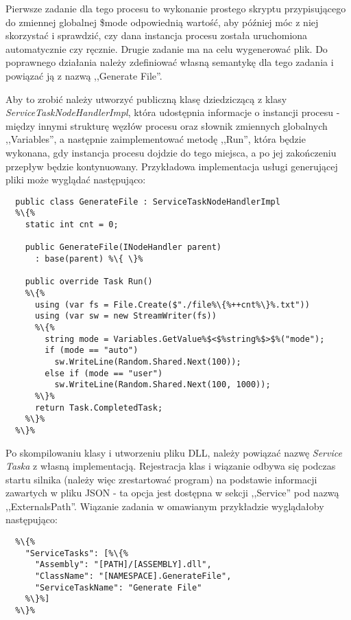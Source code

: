 \documentclass[declaration,shortabstract,mgr]{iithesis}
\begin{document}
Pierwsze zadanie dla tego procesu to wykonanie prostego skryptu przypisującego do zmiennej globalnej \$mode odpowiednią wartość, aby później móc z niej skorzystać i sprawdzić, czy dana instancja procesu została uruchomiona automatycznie czy ręcznie. Drugie zadanie ma na celu wygenerować plik. Do poprawnego działania należy zdefiniować własną semantykę dla tego zadania i powiązać ją z nazwą ,,Generate File''.

Aby to zrobić należy utworzyć publiczną klasę dziedziczącą z klasy \textit{ServiceTaskNodeHandlerImpl}, która udostępnia informacje o instancji procesu - między innymi strukturę węzłów procesu oraz słownik zmiennych globalnych ,,Variables'', a następnie zaimplementować metodę ,,Run'', która będzie wykonana, gdy instancja procesu dojdzie do tego miejsca, a po jej zakończeniu przepływ będzie kontynuowany. Przykładowa implementacja usługi generującej pliki może wyglądać następująco:

\begin{minipage}[c]{\textwidth}
\centering
\begin{lstlisting}
  public class GenerateFile : ServiceTaskNodeHandlerImpl
  %\{%
    static int cnt = 0;

    public GenerateFile(INodeHandler parent)
      : base(parent) %\{ \}%

    public override Task Run()
    %\{%
      using (var fs = File.Create($"./file%\{%++cnt%\}%.txt"))
      using (var sw = new StreamWriter(fs))
      %\{%
        string mode = Variables.GetValue%$<$%string%$>$%("mode");
        if (mode == "auto")
          sw.WriteLine(Random.Shared.Next(100));
        else if (mode == "user")
          sw.WriteLine(Random.Shared.Next(100, 1000));
      %\}%
      return Task.CompletedTask;
    %\}%
  %\}%
\end{lstlisting}
\end{minipage}

Po skompilowaniu klasy i utworzeniu pliku DLL, należy powiązać nazwę \textit{Service Taska} z własną implementacją. Rejestracja klas i wiązanie odbywa się podczas startu silnika (należy więc zrestartować program) na podstawie informacji zawartych w pliku JSON - ta opcja jest dostępna w sekcji ,,Service'' pod nazwą ,,ExternalsPath''. Wiązanie zadania w omawianym przykładzie wyglądałoby następująco:

\begin{minipage}[c]{\textwidth}
\centering
\begin{lstlisting}
  %\{%
    "ServiceTasks": [%\{%
      "Assembly": "[PATH]/[ASSEMBLY].dll",
      "ClassName": "[NAMESPACE].GenerateFile",
      "ServiceTaskName": "Generate File"
    %\}%]
  %\}%
\end{lstlisting}
\end{minipage}
\end{document}
